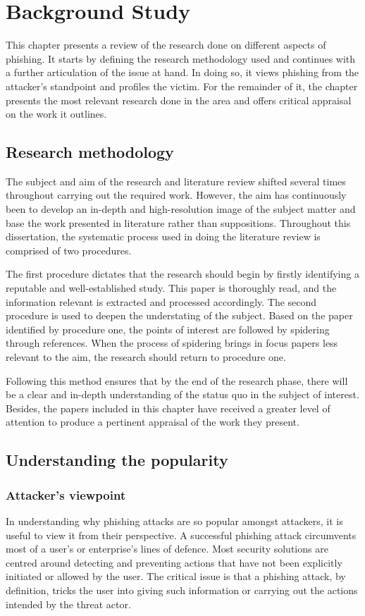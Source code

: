 \raggedbottom
\chapter{Background Study}
\label{chap:background_study}
This chapter presents a review of the research done on different aspects of phishing. It starts by defining the research methodology used and continues with a further articulation of the issue at hand. In doing so, it views phishing from the attacker's standpoint and profiles the victim. For the remainder of it, the chapter presents the most relevant research done in the area and offers critical appraisal on the work it outlines.


\section{Research methodology}
\label{sec:research_methodology}
The subject and aim of the research and literature review shifted several times throughout carrying out the required work. However, the aim has continuously been to develop an in-depth and high-resolution image of the subject matter and base the work presented in literature rather than suppositions. Throughout this dissertation, the systematic process used in doing the literature review is comprised of two procedures.

The first procedure dictates that the research should begin by firstly identifying a reputable and well-established study. This paper is thoroughly read, and the information relevant is extracted and processed accordingly.
The second procedure is used to deepen the understating of the subject. Based on the paper identified by procedure one, the points of interest are followed by spidering through references. When the process of spidering brings in focus papers less relevant to the aim, the research should return to procedure one.

Following this method ensures that by the end of the research phase, there will be a clear and in-depth understanding of the status quo in the subject of interest. Besides, the papers included in this chapter have received a greater level of attention to produce a pertinent appraisal of the work they present.


\section{Understanding the popularity}
\subsection{Attacker's viewpoint}
\label{subsec:attackers_viewpoint}
In understanding why phishing attacks are so popular amongst attackers, it is useful to view it from their perspective. A successful phishing attack circumvents most of a user's or enterprise's lines of defence. Most security solutions are centred around detecting and preventing actions that have not been explicitly initiated or allowed by the user. The critical issue is that a phishing attack, by definition, tricks the user into giving such information or carrying out the actions intended by the threat actor.

